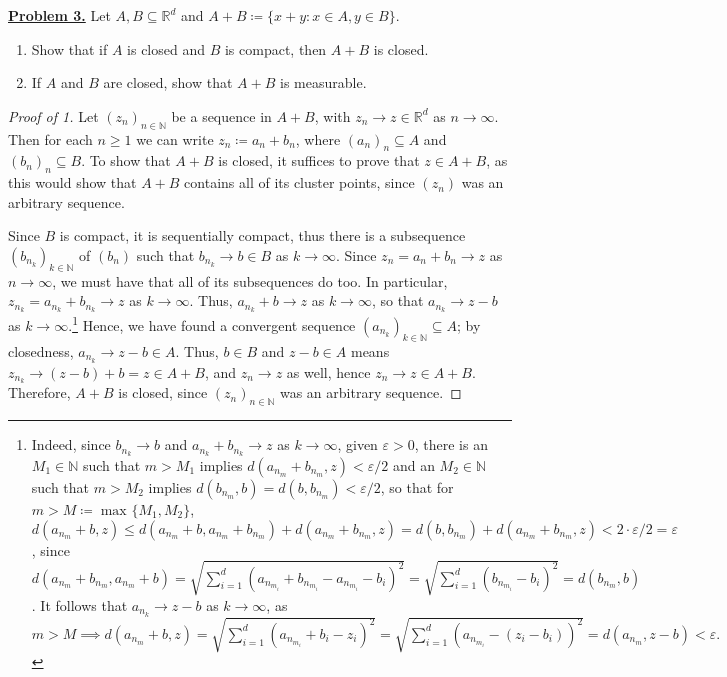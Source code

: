 \noindent \underline{\textbf{Problem 3.}} Let \( A , B \subseteq \mathbb{R}^{d} \) and \( A + B \coloneqq \{ x + y : x \in A, y \in B \}  \).
\begin{enumerate}
	\item Show that if \( A \) is closed and \( B \) is compact, then \( A + B \) is closed.
	\item If \( A \) and \( B \) are closed, show that \( A + B \) is measurable.
\end{enumerate}
\begin{proof}[Proof of 1]
Let \( (z_n)_{n \in \mathbb{N} }  \) be a sequence in \( A+B \), with \( z_n \to z \in \mathbb{R}^{d}  \) as \( n \to \infty \). Then for each \( n \geq 1 \) we can write \( z_n \coloneqq a_n + b_n \), where \( (a_n)_n \subseteq A \) and \( (b_n)_n \subseteq B \). To show that \( A+B \) is closed, it suffices to prove that \( z \in A+B \), as this would show that \( A+B \) contains all of its cluster points, since \( (z_n) \) was an arbitrary sequence.

Since \( B \) is compact, it is sequentially compact, thus there is a subsequence \( (b_{n_k})_{k \in \mathbb{N} }  \) of \( (b_n) \) such that \( b_{n_k} \to b \in B \) as \( k \to \infty \). Since \( z_n = a_n + b_n \to z \) as \( n \to \infty \), we must have that all of its subsequences do too. In particular, \( z_{n_k} = a_{n_k} + b_{n_k} \to z    \) as \( k \to \infty \). Thus, \( a_{n_k} + b \to z \) as \( k \to \infty \), so that \( a_{n_k} \to z - b \) as \( k \to \infty \).\footnote{Indeed, since \( b_{n_k} \to b \) and \( a_{n_k} + b_{n_k} \to z \) as \( k \to \infty \), given \( \varepsilon > 0 \), there is an \( M_1 \in \mathbb{N}  \) such that \( m > M_1 \) implies \( d(a_{n_m} + b_{n_m}, z) < \varepsilon /2 \) and an \( M_2 \in \mathbb{N}  \) such that \( m > M_2 \) implies \( d(b_{n_m}, b ) = d(b, b_{n_m} )< \varepsilon  / 2  \), so that for \( m > M \coloneqq \max_{}\{ M_1, M_2 \}  \), \( d(a_{n_m} + b , z ) \leq d(a_{n_m} + b, a_{n_m} + b_{n_m}   ) + d(a_{n_m} + b_{n_m}, z  ) = d(b, b_{n_m}  ) + d(a_{n_m} + b_{n_m}, z  ) < 2 \cdot \varepsilon /2 = \varepsilon \), since \( d(a_{n_m} + b_{n_m}, a_{n_m} + b) = \sqrt{\sum_{i=1}^{d}(a_{n_m_i} + b_{n_m_i} - a_{n_m_i} - b_i  )^{2} } = \sqrt{\sum_{i=1}^{d}(b_{n_m_i}- b_i  )^{2} }   = d(b_{n_m}, b )  \). It follows that \( a_{n_k} \to z - b \) as \( k \to \infty \), as \( m > M \implies d(a_{n_m} + b ,z ) = \sqrt{\sum_{i=1}^{d}(a_{n_m_i} + b_i - z_i )^{2} } =  \sqrt{\sum_{i=1}^{d}(a_{n_m_i} - (z_i-b_i) )^{2} } = d(a_{n_m}, z - b ) < \varepsilon .\)} Hence, we have found a convergent sequence \( (a_{n_k})_{k \in \mathbb{N} } \subseteq A \); by closedness, \( a_{n_k} \to z - b \in A \). Thus, \( b \in B \) and \( z - b \in A \) means \( z_{n_k} \to (z-b) + b = z \in A+B \), and \( z_n \to z \) as well, hence \( z_n \to z \in A+B \). Therefore, \( A+B \) is closed, since \( (z_n)_{n \in \mathbb{N} }  \) was an arbitrary sequence. 
\end{proof}
